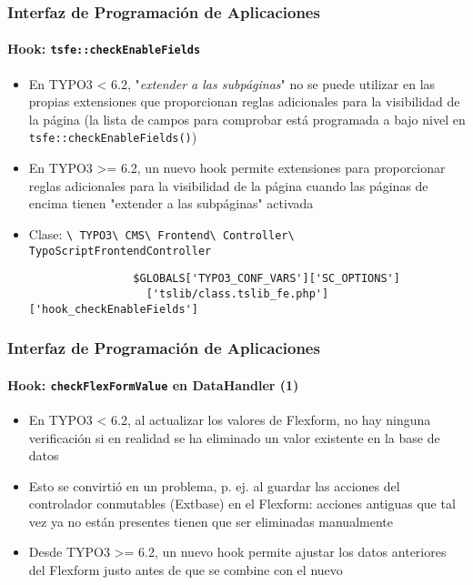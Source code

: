 \begin{frame}[fragile]
	\frametitle{Interfaz de Programación de Aplicaciones}
	\framesubtitle{Hook: \texttt{tsfe::checkEnableFields}}

	\begin{itemize}
		\item En TYPO3 < 6.2, "\emph{extender a las subpáginas}" no se puede utilizar en las propias extensiones que proporcionan reglas adicionales para la visibilidad de la página\newline
			\small(la lista de campos para comprobar está programada a bajo nivel en \texttt{tsfe::checkEnableFields()})\normalsize

		\item En TYPO3 >= 6.2, un nuevo hook permite extensiones para proporcionar reglas adicionales para la visibilidad de la página cuando las páginas de encima tienen "extender a las subpáginas" activada
		\item Clase:\newline
			\smaller
				\texttt{\textbackslash
					TYPO3\textbackslash
					CMS\textbackslash
					Frontend\textbackslash
					Controller\textbackslash
					TypoScriptFrontendController}\normalsize

			\lstset{
				basicstyle=\smaller\ttfamily
			}

			\begin{lstlisting}
				$GLOBALS['TYPO3_CONF_VARS']['SC_OPTIONS']
				  ['tslib/class.tslib_fe.php']['hook_checkEnableFields']
			\end{lstlisting}

	\end{itemize}

\end{frame}


\begin{frame}[fragile]
	\frametitle{Interfaz de Programación de Aplicaciones}
	\framesubtitle{Hook: \texttt{checkFlexFormValue} en DataHandler (1)}

	\begin{itemize}
		\item En TYPO3 < 6.2, al actualizar los valores de Flexform, no hay ninguna verificación si en realidad se ha eliminado un valor existente en la base de datos
		\item Esto se convirtió en un problema, p. ej. al guardar las acciones del controlador conmutables (Extbase) en el Flexform: acciones antiguas que tal vez ya no están presentes tienen que ser eliminadas manualmente

		\item Desde TYPO3 >= 6.2, un nuevo hook permite ajustar los datos anteriores del Flexform justo antes de que se combine con el nuevo
	\end{itemize}

\end{frame}

